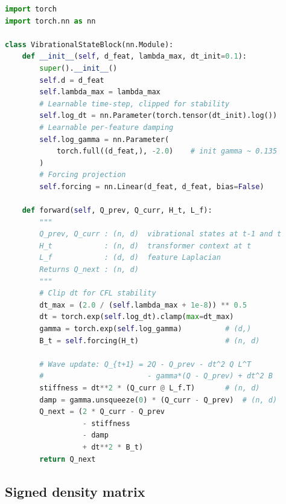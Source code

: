 \documentclass[12pt,a4paper]{article}
\theoremstyle{plain}
\theoremstyle{definition}
\theoremstyle{remark}
\newcommand{\1}{\mathbf{1}}
\begin{document}
\begin{lstlisting}[language=Python,
  caption={Vibrational state block implementing the discrete wave update.}]
import torch
import torch.nn as nn

class VibrationalStateBlock(nn.Module):
    def __init__(self, d_feat, lambda_max, dt_init=0.1):
        super().__init__()
        self.d = d_feat
        self.lambda_max = lambda_max
        # Learnable time-step, clipped for stability
        self.log_dt = nn.Parameter(torch.tensor(dt_init).log())
        # Learnable per-feature damping
        self.log_gamma = nn.Parameter(
            torch.full((d_feat,), -2.0)    # init gamma ~ 0.135
        )
        # Forcing projection
        self.forcing = nn.Linear(d_feat, d_feat, bias=False)

    def forward(self, Q_prev, Q_curr, H_t, L_f):
        """
        Q_prev, Q_curr : (n, d)  vibrational states at t-1 and t
        H_t            : (n, d)  transformer context at t
        L_f            : (d, d)  feature Laplacian
        Returns Q_next : (n, d)
        """
        # Clip dt for CFL stability
        dt_max = (2.0 / (self.lambda_max + 1e-8)) ** 0.5
        dt = torch.exp(self.log_dt).clamp(max=dt_max)
        gamma = torch.exp(self.log_gamma)          # (d,)
        B_t = self.forcing(H_t)                    # (n, d)

        # Wave update: Q_{t+1} = 2Q - Q_prev - dt^2 Q L^T
        #                        - gamma*(Q - Q_prev) + dt^2 B
        stiffness = dt**2 * (Q_curr @ L_f.T)       # (n, d)
        damp = gamma.unsqueeze(0) * (Q_curr - Q_prev)  # (n, d)
        Q_next = (2 * Q_curr - Q_prev
                  - stiffness
                  - damp
                  + dt**2 * B_t)
        return Q_next
\end{lstlisting}

\subsection{Signed density matrix}
\end{document}

